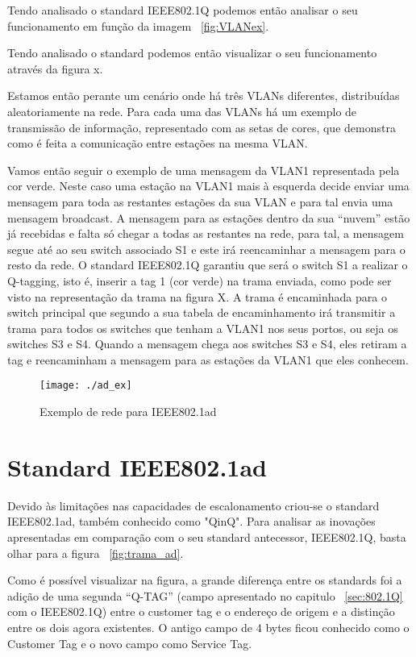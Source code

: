 \documentclass[a4paper]{IEEEtran}
\begin{document}
Tendo analisado o standard IEEE802.1Q podemos então analisar o seu funcionamento em função da imagem ~\ref{fig:VLANex}.

 Tendo analisado o standard podemos então visualizar o seu funcionamento através da figura x.
 
 Estamos então perante um cenário onde há três VLANs diferentes, distribuídas aleatoriamente na rede. Para cada uma das VLANs há um exemplo de transmissão de informação, representado com as setas de cores, que demonstra como é feita a comunicação entre estações na mesma VLAN. 
 
 Vamos então seguir o exemplo de uma mensagem da VLAN1 representada pela cor verde. Neste caso uma estação na VLAN1 mais à esquerda decide enviar uma mensagem para toda as restantes estações da sua VLAN e para tal envia uma mensagem broadcast. A mensagem para as estações dentro da sua “nuvem” estão já recebidas e falta só chegar a todas as restantes na rede, para tal, a mensagem segue até ao seu switch associado S1 e este irá reencaminhar a mensagem para o resto da rede. O standard IEEE802.1Q garantiu que será o switch S1 a realizar o Q-tagging, isto é, inserir a tag 1 (cor verde) na trama enviada, como pode ser visto na representação da trama na figura X. A trama é encaminhada para o switch principal que segundo a sua tabela de encaminhamento irá transmitir a trama para todos os switches que tenham a VLAN1 nos seus portos, ou seja os switches S3 e S4. Quando a mensagem chega aos switches S3 e S4, eles retiram a tag e reencaminham a mensagem para as estações da VLAN1 que eles conhecem.

 \begin{figure*}
 	\centering
 	\texttt{[image: ./ad\_ex]}
 	\caption{Exemplo de rede para IEEE802.1ad}
 	\label{fig:adex}
 \end{figure*}

\section{Standard IEEE802.1ad}
\label{sec:802.1ad}

Devido às limitações nas capacidades de escalonamento criou-se o standard IEEE802.1ad, também conhecido como "QinQ". Para analisar as inovações apresentadas em comparação com o seu standard antecessor, IEEE802.1Q, basta olhar para a figura ~\ref{fig:trama_ad}. 

Como é possível visualizar na figura, a grande diferença entre os standards foi a adição de uma segunda “Q-TAG” (campo apresentado no capitulo ~\ref{sec:802.1Q} com o IEEE802.1Q) entre o customer tag e o endereço de origem e a distinção entre os dois agora existentes. O antigo campo de 4 bytes ficou conhecido como o Customer Tag e o novo campo como Service Tag.
\end{document}
